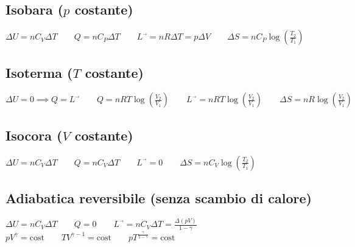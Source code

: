 \documentclass[a4paper,NoNotes,GeneralMath,12pt]{stdmdoc}
\begin{document}
	\subsection*{Isobara ($p$ costante)}
	$\Delta U = n C_V \Delta T \qquad Q = n C_P \Delta T \qquad L^{\vec{}} = nR \Delta T = p \Delta V \qquad \Delta S = n C_P \log \left( \frac{T_2}{T_1} \right)$
	
	\subsection*{Isoterma ($T$ costante)}
	$\Delta U = 0 \implies Q = L^{\vec{}} \qquad Q = nRT \log \left( \frac{V_2}{V_1} \right) \qquad L^{\vec{}} = nRT \log \left( \frac{V_2}{V_1} \right) \qquad \Delta S = nR \log \left( \frac{V_2}{V_1} \right) $

	\subsection*{Isocora ($V$ costante)}
	$\Delta U = n C_V \Delta T \qquad Q = n C_V \Delta T \qquad L^{\vec{}} = 0 \qquad \Delta S = n C_V \log \left( \frac{T_2}{T_1} \right)$

	\subsection*{Adiabatica reversibile (senza scambio di calore)}
	$\Delta U = n C_V \Delta T \qquad Q = 0 \qquad L^{\vec{}} = n C_V \Delta T = \frac{\Delta (pV)}{1 - \gamma}$ \\ $pV^\gamma = \text{cost} \qquad TV^{\gamma -1} = \text{cost} \qquad pT^{\frac{\gamma}{1-\gamma}} = \text{cost}$
\end{document}
